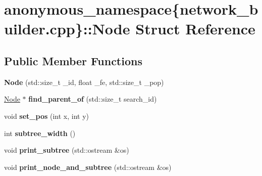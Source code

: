 \hypertarget{structanonymous__namespace_02network__builder_8cpp_03_1_1Node}{\section{anonymous\-\_\-namespace\{network\-\_\-builder.\-cpp\}\-:\-:Node Struct Reference}
\label{structanonymous__namespace_02network__builder_8cpp_03_1_1Node}
}
\subsection*{Public Member Functions}
\begin{DoxyCompactItemize}
\item 
\hypertarget{structanonymous__namespace_02network__builder_8cpp_03_1_1Node_aa6a862839457f3706ca937a8771b0f0d}{{\bfseries Node} (std\-::size\-\_\-t \-\_\-id, float \-\_\-fe, std\-::size\-\_\-t \-\_\-pop)}\label{structanonymous__namespace_02network__builder_8cpp_03_1_1Node_aa6a862839457f3706ca937a8771b0f0d}

\item 
\hypertarget{structanonymous__namespace_02network__builder_8cpp_03_1_1Node_a8ab57ff3ccf727a119985f89f931ab78}{\hyperlink{structanonymous__namespace_02network__builder_8cpp_03_1_1Node}{Node} $\ast$ {\bfseries find\-\_\-parent\-\_\-of} (std\-::size\-\_\-t search\-\_\-id)}\label{structanonymous__namespace_02network__builder_8cpp_03_1_1Node_a8ab57ff3ccf727a119985f89f931ab78}

\item 
\hypertarget{structanonymous__namespace_02network__builder_8cpp_03_1_1Node_a50ce234681c2a3cfbef86251ce2c3bd3}{void {\bfseries set\-\_\-pos} (int x, int y)}\label{structanonymous__namespace_02network__builder_8cpp_03_1_1Node_a50ce234681c2a3cfbef86251ce2c3bd3}

\item 
\hypertarget{structanonymous__namespace_02network__builder_8cpp_03_1_1Node_acf74e499ab80128e18464ac01dccbf37}{int {\bfseries subtree\-\_\-width} ()}\label{structanonymous__namespace_02network__builder_8cpp_03_1_1Node_acf74e499ab80128e18464ac01dccbf37}

\item 
\hypertarget{structanonymous__namespace_02network__builder_8cpp_03_1_1Node_a815aab3b0c2c8c970eef32ee8514885d}{void {\bfseries print\-\_\-subtree} (std\-::ostream \&os)}\label{structanonymous__namespace_02network__builder_8cpp_03_1_1Node_a815aab3b0c2c8c970eef32ee8514885d}

\item 
\hypertarget{structanonymous__namespace_02network__builder_8cpp_03_1_1Node_a5c25aa05b70740826755b8cc38e6b473}{void {\bfseries print\-\_\-node\-\_\-and\-\_\-subtree} (std\-::ostream \&os)}\label{structanonymous__namespace_02network__builder_8cpp_03_1_1Node_a5c25aa05b70740826755b8cc38e6b473}

\end{DoxyCompactItemize}
